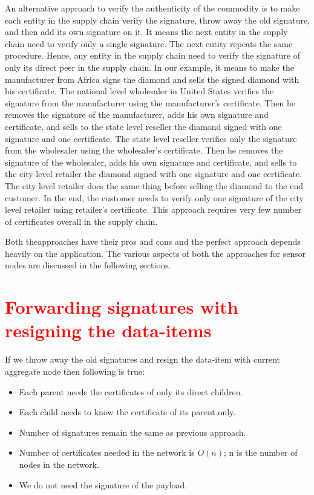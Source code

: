 An alternative approach to verify the authenticity of the commodity is to make each entity in the supply chain verify the signature, throw away the old signature, and then add its own signature on it. 
It means the next entity in the supply chain need to verify only a single signature.
The next entity repeats the same procedure.
Hence, any entity in the supply chain need to verify the signature of only its direct peer in the supply chain. 
In our example, it means to make the manufacturer from Africa signs the diamond and sells the signed diamond with his certificate.
The national level wholesaler in United States verifies the signature from the manufacturer using the manufacturer's certificate.
Then he removes the signature of the manufacturer, adds his own signature and certificate, and sells to the state level reseller the diamond signed with one signature and one certificate.
The state level reseller verifies only the signature from the wholesaler using the wholesaler's certificate.
Then he removes the signature of the wholesaler, adds his own signature and certificate, and sells to the city level retailer the diamond signed with one signature and one certificate.
The city level retailer does the same thing before selling the diamond to the end customer.
In the end, the customer needs to verify only one signature of the city level retailer using retailer's certificate.
This approach requires very few number of certificates overall in the supply chain.

Both theapproaches have their pros and cons and the perfect approach depends heavily on the application.
The various aspects of both the approaches for sensor nodes are discussed in the following sections.

	\section{\textcolor{red}{Forwarding signatures with resigning the data-items}}
		If we throw away the old signatures and resign the data-item with current aggregate node then following is true:
			\begin{itemize}
				\item Each parent needs the certificates of only its direct children.
				\item Each child needs to know the certificate of its parent only.
				\item Number of signatures remain the same as previous approach.
				\item Number of certificates needed in the network is $O(n)$; n is the number of nodes in the network.
				\item We do not need the signature of the payload.
			\end{itemize}

